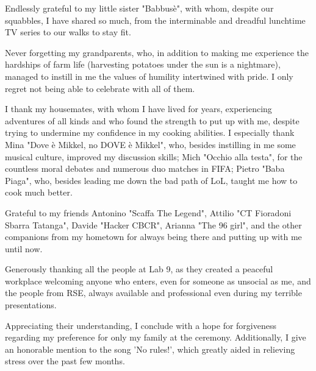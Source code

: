 \documentclass[%
	corpo=11pt,
    twoside,
    stile=classica,
    oldstyle,
    tipotesi=custom,
    greek,
    evenboxes,
]{toptesi}
\begin{document}
Endlessly grateful to my little sister "Babbusè", with whom, despite our squabbles, I have shared so much, from the interminable and dreadful lunchtime TV series to our walks to stay fit.

Never forgetting my grandparents, who, in addition to making me experience the hardships of farm life (harvesting potatoes under the sun is a nightmare), managed to instill in me the values of humility intertwined with pride. I only regret not being able to celebrate with all of them.

I thank my housemates, with whom I have lived for years, experiencing adventures of all kinds and who found the strength to put up with me, despite trying to undermine my confidence in my cooking abilities. I especially thank Mina "Dove è Mikkel, no DOVE è Mikkel", who, besides instilling in me some musical culture, improved my discussion skills; Mich "Occhio alla testa", for the countless moral debates and numerous duo matches in FIFA; Pietro "Baba Piaga", who, besides leading me down the bad path of LoL, taught me how to cook much better.

Grateful to my friends Antonino "Scaffa The Legend", Attilio "CT Fioradoni Sbarra Tatanga", Davide "Hacker CBCR", Arianna "The 96 girl", and the other companions from my hometown for always being there and putting up with me until now.

Generously thanking all the people at Lab 9, as they created a peaceful workplace welcoming anyone who enters, even for someone as unsocial as me, and the people from RSE, always available and professional even during my terrible presentations.

Appreciating their understanding, I conclude with a hope for forgiveness regarding my preference for only my family at the ceremony. Additionally, I give an honorable mention to the song 'No rules!', which greatly aided in relieving stress over the past few months.

\tablespagetrue\figurespagetrue%

\indici%


\mainmatter






















\end{document}
